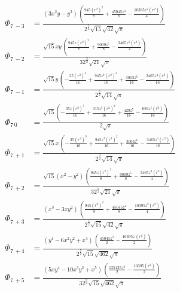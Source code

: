 \documentclass[10pt]{article}
\begin{document}
\begin{align*}
\Phi_{7\, -3} &= \frac{\left( 3 {{x}^{2}} y-{{y}^{3}}\right) \, \left( \frac{945 {{\left( r^2\right) }^{2}}}{8}+\frac{45045 {{z}^{4}}}{8}-\frac{10395 {{z}^{2}} \left( r^2\right) }{4}\right) }{{{2}^{\frac{5}{2}}} \sqrt{15} \sqrt{42} \sqrt{\ensuremath{\pi} }} \\
\Phi_{7\, -2} &= \frac{\sqrt{15} x y\, \left( \frac{945 z {{\left( r^2\right) }^{2}}}{8}+\frac{9009 {{z}^{5}}}{8}-\frac{3465 {{z}^{3}} \left( r^2\right) }{4}\right) }{3 {{2}^{\frac{3}{2}}} \sqrt{21} \sqrt{\ensuremath{\pi} }} \\
\Phi_{7\, -1} &= \frac{\sqrt{15} y\, \left( -\frac{35 {{\left( r^2\right) }^{3}}}{16}+\frac{945 {{z}^{2}} {{\left( r^2\right) }^{2}}}{16}+\frac{3003 {{z}^{6}}}{16}-\frac{3465 {{z}^{4}} \left( r^2\right) }{16}\right) }{{{2}^{\frac{3}{2}}} \sqrt{14} \sqrt{\ensuremath{\pi} }} \\
\Phi_{7\, 0} &= \frac{\sqrt{15} \left( -\frac{35 z {{\left( r^2\right) }^{3}}}{16}+\frac{315 {{z}^{3}} {{\left( r^2\right) }^{2}}}{16}+\frac{429 {{z}^{7}}}{16}-\frac{693 {{z}^{5}} \left( r^2\right) }{16}\right) }{2 \sqrt{\ensuremath{\pi} }} \\
\Phi_{7\, +1} &= \frac{\sqrt{15} x\, \left( -\frac{35 {{\left( r^2\right) }^{3}}}{16}+\frac{945 {{z}^{2}} {{\left( r^2\right) }^{2}}}{16}+\frac{3003 {{z}^{6}}}{16}-\frac{3465 {{z}^{4}} \left( r^2\right) }{16}\right) }{{{2}^{\frac{3}{2}}} \sqrt{14} \sqrt{\ensuremath{\pi} }} \\
\Phi_{7\, +2} &= \frac{\sqrt{15} \left( {{x}^{2}}-{{y}^{2}}\right) \, \left( \frac{945 z {{\left( r^2\right) }^{2}}}{8}+\frac{9009 {{z}^{5}}}{8}-\frac{3465 {{z}^{3}} \left( r^2\right) }{4}\right) }{3 {{2}^{\frac{5}{2}}} \sqrt{21} \sqrt{\ensuremath{\pi} }} \\
\Phi_{7\, +3} &= \frac{\left( {{x}^{3}}-3 x {{y}^{2}}\right) \, \left( \frac{945 {{\left( r^2\right) }^{2}}}{8}+\frac{45045 {{z}^{4}}}{8}-\frac{10395 {{z}^{2}} \left( r^2\right) }{4}\right) }{{{2}^{\frac{5}{2}}} \sqrt{15} \sqrt{42} \sqrt{\ensuremath{\pi} }} \\
\Phi_{7\, +4} &= \frac{\left( {{y}^{4}}-6 {{x}^{2}} {{y}^{2}}+{{x}^{4}}\right) \, \left( \frac{45045 {{z}^{3}}}{2}-\frac{10395 z\, \left( r^2\right) }{2}\right) }{{{2}^{\frac{7}{2}}} \sqrt{15} \sqrt{462} \sqrt{\ensuremath{\pi} }} \\
\Phi_{7\, +5} &= \frac{\left( 5 x {{y}^{4}}-10 {{x}^{3}} {{y}^{2}}+{{x}^{5}}\right) \, \left( \frac{135135 {{z}^{2}}}{2}-\frac{10395 \left( r^2\right) }{2}\right) }{3 {{2}^{\frac{9}{2}}} \sqrt{15} \sqrt{462} \sqrt{\ensuremath{\pi} }} \\

\end{align*}
\end{document}
